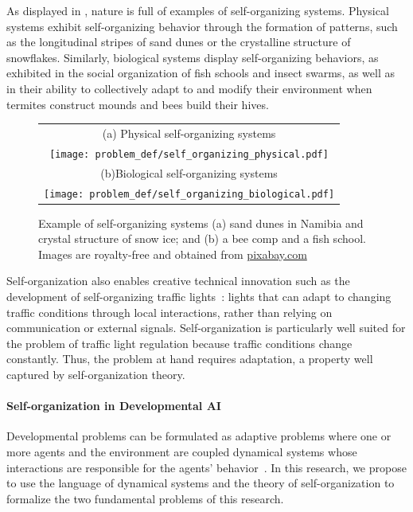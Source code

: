 As displayed in , nature is full of examples of self-organizing systems. Physical systems exhibit self-organizing behavior through the formation of patterns, such as the longitudinal stripes of sand dunes or the crystalline structure of snowflakes. Similarly, biological systems display self-organizing behaviors\citep{camazine2001self-organization}, as exhibited in the social organization of fish schools and insect swarms, as well as in their ability to collectively adapt to and modify their environment when termites construct mounds and bees build their hives.
%
\begin{figure}[!h]
\small
\centering
\begin{tabular}{c}
	(a) Physical self-organizing systems\\
	\texttt{[image: problem\_def/self\_organizing\_physical.pdf]}\\
	(b)Biological self-organizing systems\\
	\texttt{[image: problem\_def/self\_organizing\_biological.pdf]}
\end{tabular}
\caption{Example of self-organizing systems (a) sand dunes in Namibia and crystal structure of snow ice; and (b) a bee comp and a fish school. Images are royalty-free and obtained from \url{pixabay.com}}
\label{fig:example_self_org}	
\end{figure}

Self-organization also enables creative technical innovation such as the development of self-organizing traffic lights~\citep{ferreira2010self-organized}: lights that can adapt to changing traffic conditions through local interactions, rather than relying on communication or external signals. Self-organization is particularly well suited for the problem of traffic light regulation because traffic conditions change constantly. Thus, the problem at hand requires adaptation, a property well captured by self-organization theory.

\paragraph{Self-organization in Developmental AI}

Developmental \ai problems can be formulated as adaptive problems where one or more agents and the environment are coupled dynamical systems whose interactions are responsible for the agents' behavior~\citep{beer1995dynamical}. In this research, we propose to use the language of dynamical systems and the theory of self-organization to formalize the two fundamental problems of this research.


